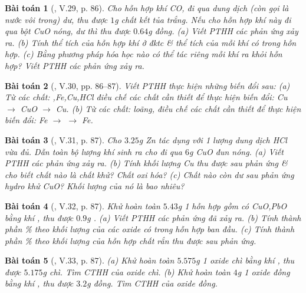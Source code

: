 \documentclass{article}
\newtheorem{baitoan}{Bài toán}
\begin{document}
\begin{baitoan}[\cite{Truong_BTNC_Hoa_Hoc_8_2022}, V.29, p. 86]
	Cho hỗn hợp khí \emph{CO,} đi qua dung dịch \emph{} (còn gọi là \emph{nước vôi trong}) dư, thu được $1$\emph{g} chất kết tủa trắng. Nếu cho hỗn hợp khí này đi qua bột \emph{CuO} nóng, dư thì thu được $0.64$\emph{g} đồng. (a) Viết PTHH các phản ứng xảy ra. (b) Tính thể tích của hỗn hợp khí ở đktc \& thể tích của mỗi khí có trong hỗn hợp. (c) Bằng phương pháp hóa học nào có thể tác riêng mỗi khí ra khỏi hỗn hợp? Viết PTHH các phản ứng xảy ra.
\end{baitoan}

\begin{baitoan}[\cite{Truong_BTNC_Hoa_Hoc_8_2022}, V.30, pp. 86--87]
	Viết PTHH thực hiện những biến đổi sau: (a) Từ các chất: \emph{,Fe,Cu,HCl} điều chế các chất cần thiết để thực hiện biến đổi: \emph{Cu $\to$ CuO $\to$ Cu}. (b) Từ các chất: \emph{} loãng, điều chế các chất cần thiết để thực hiện biến đổi: \emph{Fe $\to$  $\to$ Fe}.
\end{baitoan}

\begin{baitoan}[\cite{Truong_BTNC_Hoa_Hoc_8_2022}, V.31, p. 87]
	Cho $3.25$\emph{g Zn} tác dụng với 1 lượng dung dịch \emph{HCl} vừa đủ. Dẫn toàn bộ lượng khí sinh ra cho đi qua $6$\emph{g CuO} đun nóng. (a) Viết PTHH các phản ứng xảy ra. (b) Tính khối lượng \emph{Cu} thu được sau phản ứng \& cho biết chất nào là chất khử? Chất oxi hóa? (c) Chất nào còn dư sau phản ứng hydro khử \emph{CuO}? Khối lượng của nó là bao nhiêu?
\end{baitoan}

\begin{baitoan}[\cite{Truong_BTNC_Hoa_Hoc_8_2022}, V.32, p. 87]
	Khử hoàn toàn $5.43$\emph{g} 1 hỗn hợp gồm có \emph{CuO,PbO} bằng khí \emph{}, thu được $0.9$\emph{g }. (a) Viết PTHH các phản ứng đã xảy ra. (b) Tính thành phần \% theo khối lượng của các oxide có trong hỗn hợp ban đầu. (c) Tính thành phần \% theo khối lượng của hỗn hợp chất rắn thu được sau phản ứng.
\end{baitoan}

\begin{baitoan}[\cite{Truong_BTNC_Hoa_Hoc_8_2022}, V.33, p. 87]
	(a) Khử hoàn toàn $5.575$\emph{g} 1 oxide chì bằng khí \emph{}, thu được $5.175$\emph{g} chì. Tìm CTHH của oxide chì. (b) Khử hoàn toàn $4$\emph{g} 1 oxide đồng bằng khí \emph{}, thu được $3.2$\emph{g} đồng. Tìm CTHH của oxide đồng.
\end{baitoan}
\end{document}

